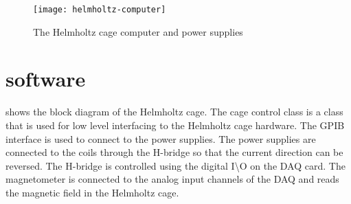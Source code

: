 \begin{figure}[!ht]
    \texttt{[image: helmholtz-computer]}
    \caption{The Helmholtz cage computer and power supplies}
    \label{fig:helmholtz-comp}
\end{figure}

\section{software}

 shows the block diagram of the Helmholtz cage. The cage control class is a \matlab class that is used for low level interfacing to the Helmholtz cage hardware. The \ac{GPIB} interface is used to connect to the power supplies. The power supplies are connected to the coils through the H-bridge so that the current direction can be reversed. The H-bridge is controlled using the digital I\textbackslash{}O on the \ac{DAQ} card. The magnetometer is connected to the analog input channels of the \ac{DAQ} and reads the magnetic field in the Helmholtz cage. 

